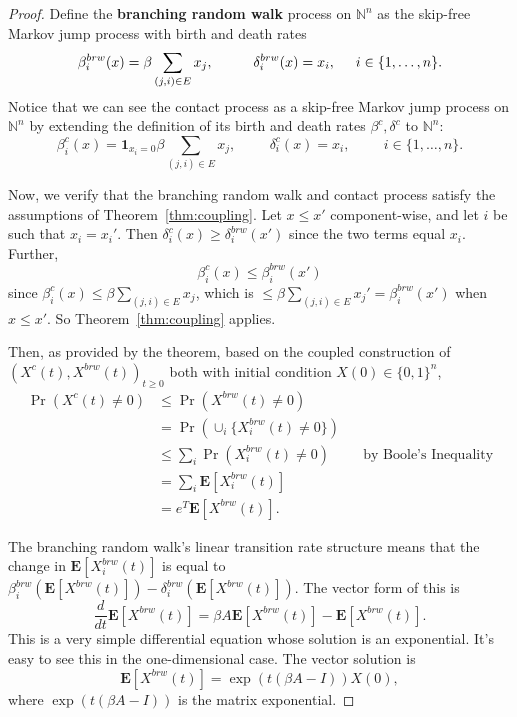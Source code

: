 \documentclass[11pt]{article}
\begin{document}
\begin{proof}
Define the \textbf{branching random walk} process on $\mathbb{N}^n$ as the skip-free Markov jump process with birth and death rates
$$\beta_i^{brw}(x) = \beta \sum_{(j,i)\in E} x_j, \hspace{1cm} \delta_i^{brw}(x) = x_i, \hspace{0.5cm} i\in \{1,\ldots,n\}.$$
Notice that we can see the contact process as a skip-free Markov jump process on $\mathbb{N}^n$ by extending the definition of its birth and death rates $\beta^c, \delta^c$ to $\mathbb{N}^n$:
$$\beta_i^c(x) = \mathbf{1}_{x_i=0} \beta \sum_{(j,i)\in E} x_j, \hspace{1cm} \delta_i^c(x) = x_i, \hspace{1cm} i\in\{1,\ldots,n\}.$$

Now, we verify that the branching random walk and contact process satisfy the assumptions of Theorem~\ref{thm:coupling}. Let $x\leq x'$ component-wise, and let $i$ be such that $x_i=x_i'$. Then $\delta_i^c(x) \geq \delta_i^{brw}(x')$ since the two terms equal $x_i$. Further,
$$\beta_i^c(x) \leq \beta_i^{brw}(x')$$
since $\beta_i^c(x) \leq \beta \sum_{(j,i)\in E} x_j$, which is $\leq \beta \sum_{(j,i)\in E} x_j' = \beta_i^{brw}(x')$ when $x\leq x'$. So Theorem~\ref{thm:coupling} applies.

Then, as provided by the theorem, based on the coupled construction of $\left(X^c(t), X^{brw}(t)\right)_{t\geq 0}$ both with initial condition $X(0)\in \{0,1\}^n$,
$$\begin{aligned}
\Pr(X^c(t)\neq 0) &\leq \Pr(X^{brw}(t)\neq 0) \\
	&= \Pr(\cup_i \{X_i^{brw}(t)\neq 0\}) \\
	&\leq \sum_i \Pr(X_i^{brw}(t)\neq 0) \hspace{1cm} \text{by Boole's Inequality}\\
	&= \sum_i \mathbf{E} [X_i^{brw}(t)] \\
	&= e^T \mathbf{E}[X^{brw}(t)].
\end{aligned}$$

The branching random walk's linear transition rate structure means that the change in $\mathbf{E}[X_i^{brw}(t)]$ is equal to $\beta_i^{brw}(\mathbf{E}[X^{brw}(t)]) - \delta_i^{brw}(\mathbf{E}[X^{brw}(t)])$. The vector form of this is
$$\frac{d}{dt} \mathbf{E}[X^{brw}(t)] = \beta A \mathbf{E}[X^{brw}(t)] - \mathbf{E}[X^{brw}(t)].$$
This is a very simple differential equation whose solution is an exponential. It's easy to see this in the one-dimensional case. The vector solution is
$$\mathbf{E}[X^{brw}(t)] = \exp(t(\beta A - I))X(0),$$
where $\exp(t(\beta A - I))$ is the matrix exponential.


\end{proof}
\end{document}
